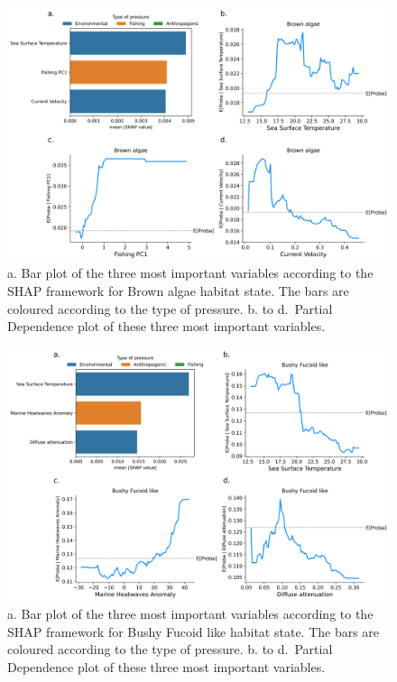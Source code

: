\newpage

\begin{figure}
\hypertarget{fig:chap3figS37}{%
\centering
\includegraphics{03-Chapitre3/figures/supplementary/04-pdp_Brown algae.png}
\caption{a. Bar plot of the three most important variables according to
the SHAP framework for Brown algae habitat state. The bars are coloured
according to the type of pressure. b. to d.~Partial Dependence plot of
these three most important variables.}\label{fig:chap3figS37}
}
\end{figure}

\begin{figure}
\hypertarget{fig:chap3figS38}{%
\centering
\includegraphics{03-Chapitre3/figures/supplementary/04-pdp_Bushy Fucoid like.png}
\caption{a. Bar plot of the three most important variables according to
the SHAP framework for Bushy Fucoid like habitat state. The bars are
coloured according to the type of pressure. b. to d.~Partial Dependence
plot of these three most important variables.}\label{fig:chap3figS38}
}
\end{figure}

